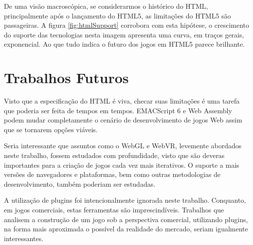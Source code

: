 De uma visão macroscópica, se considerarmos o histórico do HTML,
principalmente após o lançamento do HTML5, as limitações do HTML5
são passageiras. A figura \ref{fig:htmlSupport} corrobora com esta
hipótese, o crescimento do suporte das tecnologias nesta imagem
apresenta uma curva, em traços gerais, exponencial. Ao que tudo indica
o futuro dos jogos em HTML5 parece brilhante.

\section{Trabalhos Futuros}

Visto que a especificação do HTML é viva, checar suas limitações
é uma tarefa que poderia ser feita de tempos em tempos. EMACScript 6
e Web Assembly podem mudar completamente o cenário de desenvolvimento
de jogos Web assim que se tornarem opções viáveis.

Seria interessante que assuntos como o WebGL e WebVR, levemente
abordados neste trabalho, fossem estudados com profundidade, visto que
são deveras importantes para a criação de jogos cada vez mais
iterativos. O suporte a mais versões de navegadores e plataformas,
bem como outras metodologias de desenvolvimento, também poderiam ser
estudadas.

A utilização de plugins foi intencionalmente ignorada neste
trabalho. Conquanto, em jogos comerciais, estas ferramentas são
imprescindíveis. Trabalhos que analisem a construção de um jogo sob
a perspectiva comercial, utilizando plugins, na forma mais aproximada
o possível da realidade do mercado, seriam igualmente interessantes.
